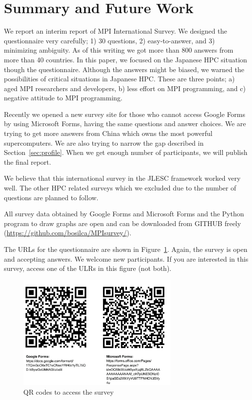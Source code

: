\documentclass[submit,techrep,noauthor,english]{ipsj}
\begin{document}
\section{Summary and Future Work}

We report an interim report of MPI International Survey. We designed
the questionnaire very carefully; 1) 30 questions, 2) easy-to-answer,
and 3) minimizing ambiguity. As of this writing we got more than 800
answers from more than 40 countries. In this paper, we focused on the
Japanese HPC situation though the questionnaire. Although the answers
might be biased, we warned the possibilities of critical situations
in Japanese HPC. These are three points; a) aged MPI researchers and
developers, b) less effort on MPI programming, and c) negative
attitude to MPI programming. 

Recently we opened a new survey site for those who cannot access
Google Forms by using Microsoft Forms, having the same questions and
answer choices. We are trying to get more answers from China which owns
the most powerful supercomputers. We are also trying to narrow the gap
described in Section~\ref{sec:profile}. When we get enough number of
participants, we will publish the final report.

We believe that this international survey in the JLESC framework worked
very well.  The other HPC related surveys which we excluded due to the
number of questions are planned to follow.

All survey data obtained by Google Forms and Microsoft Forms and the
Python program to draw graphs are open and can be downloaded from
GITHUB freely (\url{https://github.com/bosilca/MPIsurvey/}).

The URLs for the questionnaire are shown in
Figure~\ref{fig:QR-codes}. Again, the survey is open and accepting
answers. We welcome new participants. If you are interested in
this survey, access one of the ULRs in this figure (not both).

\begin{figure}[htb]
\begin{center}
\includegraphics[width=8cm]{figs/QR-codes.pdf}
\caption{QR codes to access the survey}
\label{fig:QR-codes}
\end{center}
\end{figure}
\end{document}
